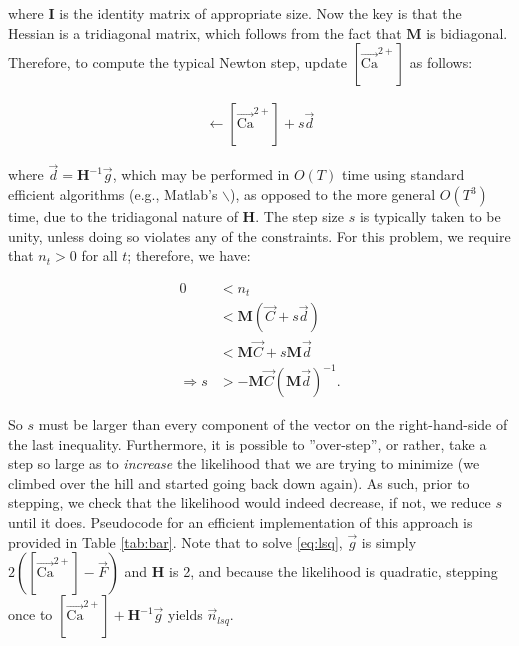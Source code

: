\documentclass[12pt]{article}
\providecommand{\ve}[1]{\vec{#1}}
\providecommand{\ma}[1]{\boldsymbol{#1}}
\providecommand{\ve}[1]{\boldsymbol{#1}}
\newcommand{\Cav}{[\ve{\text{Ca}}^{2+}]}
\begin{document}
\noindent where $\ma{I}$ is the identity matrix of appropriate size.  Now the key is that the Hessian is a tridiagonal matrix, which follows from the fact that $\ma{M}$ is bidiagonal.  Therefore, to compute the typical Newton step, update $\Cav$ as follows:

\begin{align}
\Cav \leftarrow \Cav + s \ve{d} 
\end{align}

\noindent where $\ve{d}=\ma{H}^{-1} \ve{g}$, which may be performed in $O(T)$ time using standard efficient algorithms (e.g., Matlab's $\backslash$), as opposed to the more general $O(T^3)$ time, due to the tridiagonal nature of $\ma{H}$.  The step size $s$ is typically taken to be unity, unless doing so violates any of the constraints.  For this problem, we require that $n_t>0$ for all $t$; therefore, we have:

\begin{align}
0&< n_t\\
&< \ma{M}(\ve{C} + s \ve{d})\\
&< \ma{M} \ve{C} + s \ma{M} \ve{d}\\
\Rightarrow s &> -\ma{M}\ve{C} (\ma{M} \ve{d})^{-1}.
\end{align}

\noindent So $s$ must be larger than every component of the vector on the right-hand-side of the last inequality.  Furthermore, it is possible to ''over-step'', or rather, take a step so large as to \emph{increase} the likelihood that we are trying to minimize (we climbed over the hill and started going back down again).  As such, prior to stepping, we check that the likelihood would indeed decrease, if not, we reduce $s$ until it does.  Pseudocode for an efficient implementation of this approach is provided in Table \ref{tab:bar}.  Note that to solve \eqref{eq:lsq}, $\ve{g}$ is simply $2(\Cav-\ve{F})$ and $\ma{H}$ is 2, and because the likelihood is quadratic, stepping once to $\Cav+\ma{H}^{-1}\ve{g}$ yields $\ve{n}_{lsq}$.
\end{document}
